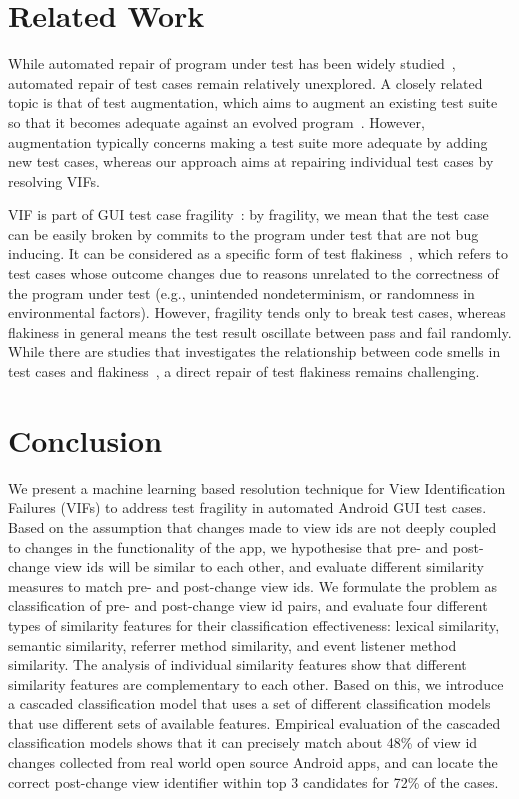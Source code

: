 \documentclass[sigconf]{acmart}
\begin{document}
\section{Related Work}
\label{sec:related_work}

While automated repair of program under test has been widely studied~\cite{Forrest:2009hi,Nguyen:2013aa,Mechtaev2016rw,Yuan2018zl,Wen2018dk}, automated
repair of test cases remain relatively unexplored. A closely related topic is
that of test augmentation, which aims to augment an existing test suite so
that it becomes adequate against an evolved program~\cite{Santelices2008aa,Xu:2011uq}. However, augmentation typically concerns making a test suite more
adequate by adding new test cases, whereas our approach aims at repairing
individual test cases by resolving VIFs.

VIF is part of GUI test case fragility~\cite{Coppola2016rd}: by fragility, we
mean that the test case can be easily broken by commits to the program under
test that are not bug inducing. It can be considered as a specific form of
test flakiness~\cite{Thorve2018vf,Bell2018fe}, which refers to
test cases whose outcome changes due to reasons unrelated to the correctness
of the program under test (e.g., unintended nondeterminism, or randomness in
environmental factors). However, fragility tends only to break test cases,
whereas flakiness in general means the test result oscillate between pass and
fail randomly. While there are studies that investigates the relationship
between code smells in test cases and flakiness~\cite{Palomba2017eq}, a direct
repair of test flakiness remains challenging.

\section{Conclusion}
\label{sec:conclusion}

We present a machine learning based resolution technique for View
Identification Failures (VIFs) to address test fragility in automated Android
GUI test cases. Based on the assumption that changes made to view ids are not
deeply coupled to changes in the functionality of the app, we hypothesise that
pre- and post-change view ids will be similar to each other, and evaluate
different similarity measures to match pre- and post-change view ids. We
formulate the problem as classification of pre- and post-change view id pairs,
and evaluate four different types of similarity features for their
classification effectiveness: lexical similarity, semantic similarity,
referrer method similarity, and event listener method similarity. The analysis
of individual similarity features show that different similarity features are
complementary to each other. Based on this, we introduce a cascaded
classification model that uses a set of different classification models that
use different sets of available features. Empirical evaluation of the cascaded
classification models shows that it can precisely match about 48\% of view id changes collected from real world open source Android apps, and can locate the correct post-change view identifier within top 3 candidates for 72\% of the cases.



\end{document}
